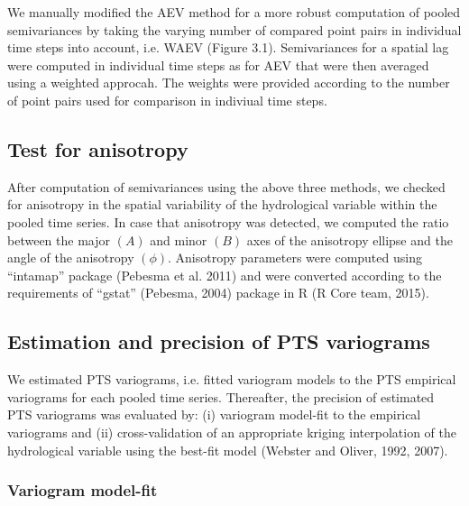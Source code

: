 We manually modified the AEV method for a more robust computation of pooled semivariances by taking the varying number of compared point pairs in individual time steps into account, i.e. WAEV (Figure 3.1). Semivariances for a spatial lag were computed in individual time steps as for AEV that were then averaged using a weighted approcah. The weights were provided according to the number of point pairs used for comparison in indiviual time steps.

\subsection{Test for anisotropy}
\label{Test for anisotropy}

After computation of semivariances using the above three methods, we checked for anisotropy in the spatial variability of the hydrological variable within the pooled time series. In case that anisotropy was detected, we computed the ratio between the major $(A)$ and minor $(B)$ axes of the anisotropy ellipse and the angle of the anisotropy $(\phi)$. Anisotropy parameters were computed using “intamap” package (Pebesma et al. 2011) and were converted according to the requirements of “gstat” (Pebesma, 2004) package in R (R Core team, 2015).

\subsection{Estimation and precision of PTS variograms}
\label{Estimation and precision of PTS variograms}

We estimated PTS variograms, i.e. fitted variogram models to the PTS empirical variograms for each pooled time series. Thereafter, the precision of estimated PTS variograms was evaluated by: (i) variogram model-fit to the empirical variograms and (ii) cross-validation of an appropriate kriging interpolation of the hydrological variable using the best-fit model (Webster and Oliver, 1992, 2007).

\subsubsection{Variogram model-fit}
\label{Variogram model-fit}

